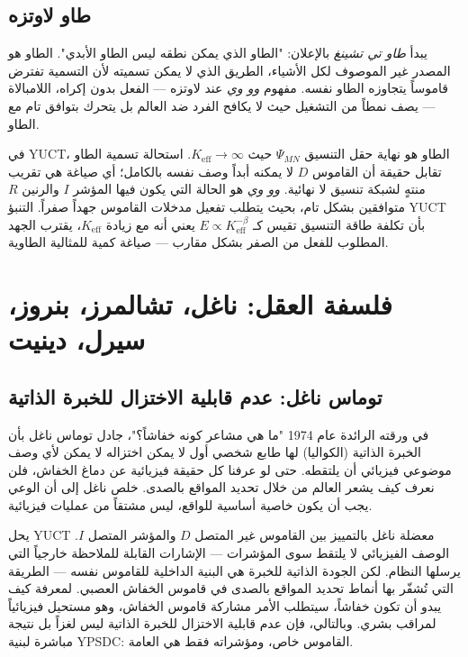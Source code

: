 \documentclass[12pt,a4paper]{article}
\begin{document}
	\subsection{طاو لاوتزه}
	
	يبدأ \emph{طاو تي تشينغ} بالإعلان: "الطاو الذي يمكن نطقه ليس الطاو الأبدي". الطاو هو المصدر غير الموصوف لكل الأشياء، الطريق الذي لا يمكن تسميته لأن التسمية تفترض قاموساً يتجاوزه الطاو نفسه. مفهوم \emph{وو وي} عند لاوتزه — الفعل بدون إكراه، اللامبالاة — يصف نمطاً من التشغيل حيث لا يكافح الفرد ضد العالم بل يتحرك بتوافق تام مع الطاو.
	
	في YUCT، الطاو هو نهاية حقل التنسيق \(\Psi_{MN}\) حيث \(K_{\mathrm{eff}} \to \infty\). استحالة تسمية الطاو تقابل حقيقة أن القاموس \(D\) لا يمكنه أبداً وصف نفسه بالكامل؛ أي صياغة هي تقريب منتهٍ لشبكة تنسيق لا نهائية. \emph{وو وي} هو الحالة التي يكون فيها المؤشر \(I\) والرنين \(R\) متوافقين بشكل تام، بحيث يتطلب تفعيل مدخلات القاموس جهداً صفراً. التنبؤ YUCT بأن تكلفة طاقة التنسيق تقيس كـ \(E \propto K_{\mathrm{eff}}^{-\beta}\) يعني أنه مع زيادة \(K_{\mathrm{eff}}\)، يقترب الجهد المطلوب للفعل من الصفر بشكل مقارب — صياغة كمية للمثالية الطاوية.
	
	\section{فلسفة العقل: ناغل، تشالمرز، بنروز، سيرل، دينيت}
	
	\subsection{توماس ناغل: عدم قابلية الاختزال للخبرة الذاتية}
	
	في ورقته الرائدة عام 1974 "ما هي مشاعر كونه خفاشاً؟"، جادل توماس ناغل بأن الخبرة الذاتية (الكواليا) لها طابع شخصي أول لا يمكن اختزاله لا يمكن لأي وصف موضوعي فيزيائي أن يلتقطه. حتى لو عرفنا كل حقيقة فيزيائية عن دماغ الخفاش، فلن نعرف كيف يشعر العالم من خلال تحديد المواقع بالصدى. خلص ناغل إلى أن الوعي يجب أن يكون خاصية أساسية للواقع، ليس مشتقاً من عمليات فيزيائية.
	
	يحل YUCT معضلة ناغل بالتمييز بين القاموس غير المتصل \(D\) والمؤشر المتصل \(I\). الوصف الفيزيائي لا يلتقط سوى المؤشرات — الإشارات القابلة للملاحظة خارجياً التي يرسلها النظام. لكن الجودة الذاتية للخبرة هي البنية الداخلية للقاموس نفسه — الطريقة التي تُشفّر بها أنماط تحديد المواقع بالصدى في قاموس الخفاش العصبي. لمعرفة كيف يبدو أن تكون خفاشاً، سيتطلب الأمر مشاركة قاموس الخفاش، وهو مستحيل فيزيائياً لمراقب بشري. وبالتالي، فإن عدم قابلية الاختزال للخبرة الذاتية ليس لغزاً بل نتيجة مباشرة لبنية YPSDC: القاموس خاص، ومؤشراته فقط هي العامة.
	
\end{document}
